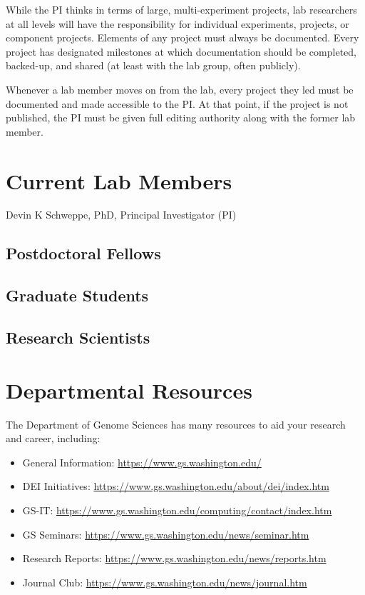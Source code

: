\documentclass[
]{book}
\providecommand{\tightlist}{%
  \setlength{\itemsep}{0pt}\setlength{\parskip}{0pt}}
\begin{document}
While the PI thinks in terms of large, multi-experiment projects, lab researchers at all levels will have the responsibility for individual experiments, projects, or component projects. Elements of any project must always be documented. Every project has designated milestones at which documentation should be completed, backed-up, and shared (at least with the lab group, often publicly).

Whenever a lab member moves on from the lab, every project they led must be documented and made accessible to the PI. At that point, if the project is not published, the PI must be given full editing authority along with the former lab member.

\hypertarget{current-lab-members}{%
\section{Current Lab Members}\label{current-lab-members}}

Devin K Schweppe, PhD, Principal Investigator (PI)

\hypertarget{postdoctoral-fellows}{%
\subsection{Postdoctoral Fellows}\label{postdoctoral-fellows}}

\hypertarget{graduate-students}{%
\subsection{Graduate Students}\label{graduate-students}}

\hypertarget{research-scientists}{%
\subsection{Research Scientists}\label{research-scientists}}

\hypertarget{departmental-resources}{%
\section{Departmental Resources}\label{departmental-resources}}

The Department of Genome Sciences has many resources to aid your research and career, including:

\begin{itemize}
\tightlist
\item
  General Information: \url{https://www.gs.washington.edu/}
\item
  DEI Initiatives: \url{https://www.gs.washington.edu/about/dei/index.htm}
\item
  GS-IT: \url{https://www.gs.washington.edu/computing/contact/index.htm}
\item
  GS Seminars: \url{https://www.gs.washington.edu/news/seminar.htm}
\item
  Research Reports: \url{https://www.gs.washington.edu/news/reports.htm}
\item
  Journal Club: \url{https://www.gs.washington.edu/news/journal.htm}
\end{itemize}
\end{document}
